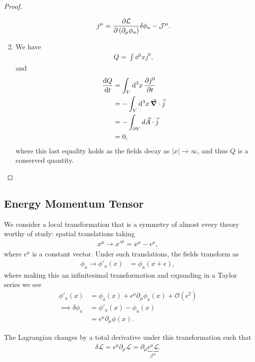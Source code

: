 \begin{proof}
\begin{enumerate}[label=\arabic*)]
\begin{align}
                j^{\mu} = \pdv{\mathcal{L}}{\left( \partial_\mu \phi_a \right) } \delta \phi_a - \mathcal{J}^{\mu}
            .\end{align}
        \item We have
            \begin{align}
                Q = \int \dd{^3x} j^{0}
            ,\end{align}
            and
            \begin{align}
                \dv{Q}{t} &= \int_V \dd{^3x} \pdv{j^{0}}{t} \\
                &= - \int_V \dd{^3x} \vec{\grad} \cdot \vec{j} \\
                &= - \int_{\partial V} d\vec{A} \cdot \vec{j} \\
                &= 0
            ,\end{align}
            where this last equality holds as the fields decay as $\left| x \right| \to \infty$, and thus $Q$ is a conserved quantity.
    \end{enumerate}
\end{proof}

\subsection{Energy Momentum Tensor}

We consider a local transformation that is a symmetry of almost every theory worthy of study: spatial translations taking
\begin{align}
    x^{\mu} \to x'^{\mu} = x^{\mu} - \epsilon^{\mu}
,\end{align}
where $\epsilon^{\mu}$ is a constant vector. Under such translations, the fields transform as
\begin{align}
    \phi_a \to \phi'_a \left( x \right) &= \phi_a \left( x + \epsilon \right) 
,\end{align}
where making this an infinitesimal transformation and expanding in a Taylor series we see
\begin{align}
    \phi'_a \left( x \right) &= \phi_a \left( x \right) + \epsilon^{\mu} \partial_\mu \phi_a \left( x \right) + \mathcal{O}\left( \epsilon^2 \right)  \\
    \implies \delta \phi_a &= \phi'_a \left( x \right) - \phi_a \left( x \right) \\
    &= \epsilon^{\mu} \partial_\mu \phi \left( x \right) 
.\end{align}

The Lagrangian changes by a total derivative under this transformation such that
\begin{align}
    \delta \mathcal{L} = \epsilon^{\mu} \partial_\mu \mathcal{L} = \partial_\mu \underbrace{\epsilon^{\mu} \mathcal{L}}_{\mathcal{J}^{\mu}}
.\end{align}

